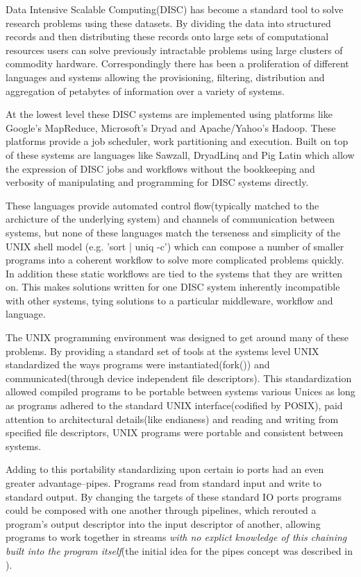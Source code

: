 \documentclass[11pt, letterpaper]{article}
\begin{document}
Data Intensive Scalable Computing(DISC)\cite{bryant2007dis} has become a standard tool to solve research problems using these datasets. By dividing the data into structured records and then distributing these records onto large sets of computational resources users can solve previously intractable problems using large clusters of commodity hardware. Correspondingly there has been a proliferation of different languages and systems allowing the provisioning, filtering, distribution and aggregation of petabytes of information over a variety of systems.

At the lowest level these DISC systems are implemented using platforms like Google's MapReduce\cite{dean2008msd}, Microsoft's Dryad\cite{isard2007ddd} and Apache/Yahoo's Hadoop\cite{bialecki:hfr}. These platforms provide a job scheduler, work partitioning and execution. Built on top of these systems are languages like Sawzall\cite{pike2005idp}, DryadLinq\cite{yu2008dsg} and Pig Latin\cite{olston2008pln} which allow the expression of DISC jobs and workflows without the bookkeeping and verbosity of manipulating and programming for DISC systems directly.

These languages provide automated control flow(typically matched to the archicture of the underlying system) and channels of communication between systems, but none of these languages match the terseness and simplicity of the UNIX shell model (e.g. 'sort | uniq -c') which can compose a number of smaller programs into a coherent workflow to solve more complicated problems quickly. In addition these static workflows are tied to the systems that they are written on. This makes solutions written for one DISC system inherently incompatible with other systems, tying solutions to a particular middleware, workflow and language.

The UNIX programming environment was designed to get around many of these problems. By providing a standard set of tools at the systems level UNIX standardized the ways programs were instantiated(fork()) and communicated(through device independent file descriptors).  This standardization allowed compiled programs to be portable between systems various Unices as long as programs adhered to the standard UNIX interface(codified by POSIX), paid attention to architectural details(like endianess) and reading and writing from specified file descriptors, UNIX programs were portable and consistent between systems. 

Adding to this portability standardizing upon certain io ports had an even greater advantage--pipes. Programs read from standard input and write to standard output. By changing the targets of these standard  IO ports programs could be composed with one another through pipelines, which rerouted a program's output descriptor into the input descriptor of another, allowing programs to work together in streams \emph{with no explict knowledge of this chaining built into the program itself}(the initial idea for the pipes concept was described in \cite{mcilroy1964paf}). 
\end{document}

